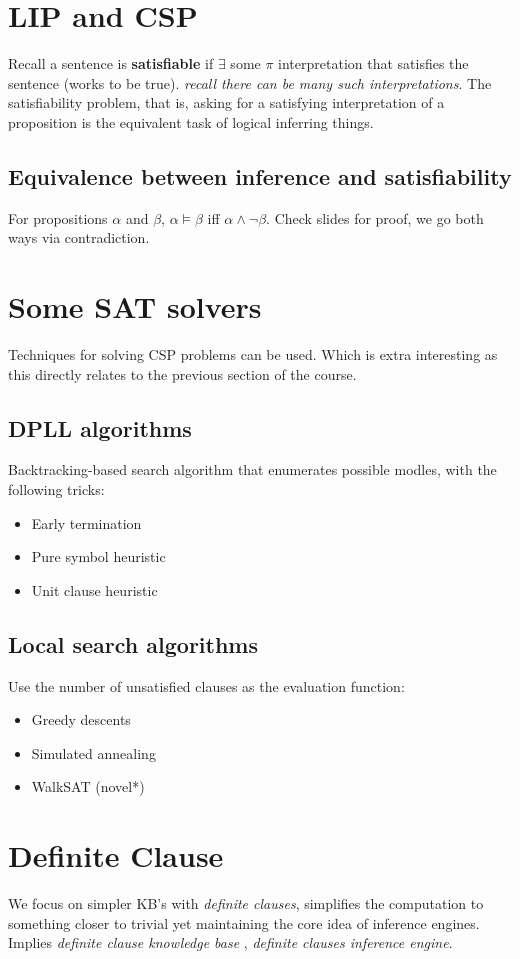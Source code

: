\documentclass{article}
\begin{document}
\section{LIP and CSP}
Recall a sentence is \textbf{satisfiable} if $\exists$ some $\pi$ interpretation that satisfies the sentence (works to be true). \emph{recall there can be many such interpretations}. The satisfiability problem, that is, asking for a satisfying interpretation of a proposition is the equivalent task of logical inferring things.

\subsection{Equivalence between inference and satisfiability}
For propositions $\alpha$ and $\beta$, $\alpha \vDash \beta$ iff $\alpha \land \lnot \beta$. Check slides for proof, we go both ways via contradiction.

\section{Some SAT solvers}
Techniques for solving CSP problems can be used. Which is extra interesting as this directly relates to the previous section of the course. 

\subsection{DPLL algorithms}
Backtracking-based search algorithm that enumerates possible modles, with the following tricks:
\begin{itemize}
	\item Early termination
	\item Pure symbol heuristic
	\item Unit clause heuristic
\end{itemize}

\subsection{Local search algorithms}
Use the number of unsatisfied clauses as the evaluation function:
\begin{itemize}
	\item Greedy descents
	\item Simulated annealing
	\item WalkSAT (novel*)
\end{itemize}

\section{Definite Clause}
We focus on simpler KB's with \emph{definite clauses}, simplifies the computation to something closer to trivial yet maintaining the core idea of inference engines. Implies \emph{definite clause knowledge base} , \emph{definite clauses inference engine}.
\end{document}
